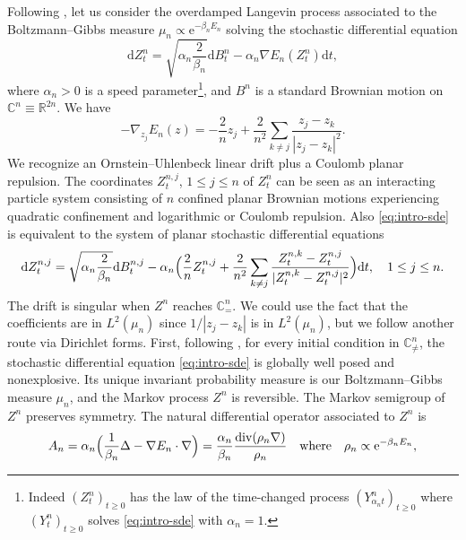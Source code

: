 \documentclass[11pt,reqno]{amsart}
\numberwithin{equation}{section}%
\numberwithin{figure}{section}%
\numberwithin{table}{section}
\theoremstyle{plain}
\theoremstyle{definition}
\begin{document}
Following \cite{BolleyChafaiFontbona}, let us consider the overdamped Langevin
process associated to the Boltzmann--Gibbs measure
$\mu_n\propto\mathrm{e}^{-\beta_n E_n}$ solving the stochastic differential
equation
\begin{equation}\label{eq:intro-sde}
  \mathrm{d}Z_t^n=\sqrt{\alpha_n\frac{2}{\beta_n}}\mathrm{d}B^n_t
  -\alpha_n\nabla E_n(Z_t^n)\mathrm{d}t,
\end{equation}
where $\alpha_n>0$ is a speed parameter\footnote{Indeed ${(Z^n_t)}_{t\geq0}$
  has the law of the time-changed process ${(Y^n_{\alpha_n t})}_{t\geq0}$
  where ${(Y^n_t)}_{t\geq0}$ solves \eqref{eq:intro-sde} with $\alpha_n=1$.},
and $B^n$ is a standard Brownian motion on
$\mathbb{C}^n\equiv\mathbb{R}^{2n}$. We have
\begin{equation}
  -\nabla_{z_j}E_n(z)
  =-\frac{2}{n}z_j+\frac{2}{n^2}\sum_{k\neq j}\frac{z_j-z_k}{|z_j-z_k|^2}.
\end{equation}
We recognize an Ornstein--Uhlenbeck linear drift plus a Coulomb planar
repulsion. The coordinates $Z^{n,j}_t$, $1\leq j\leq n$ of $Z^n_t$ can be seen
as an interacting particle system consisting of $n$ confined planar Brownian
motions experiencing quadratic confinement and logarithmic or Coulomb
repulsion. Also \eqref{eq:intro-sde} is equivalent to the system of planar
stochastic differential equations
\begin{equation}
  \mathrm{d}Z^{n,j}_t
  =\sqrt{\alpha_n\frac{2}{\beta_n}}\mathrm{d}B^{n,j}_t
  -\alpha_n\Bigl(\frac{2}{n}Z^{n,j}_t+\frac{2}{n^2}\sum_{k\neq j}\frac{Z^{n,k}_t-Z^{n,j}_t}{|Z^{n,k}_t-Z^{n,j}_t|^2}\Bigr)\mathrm{d}t,
  \quad 1\leq j\leq n.
\end{equation}
The drift is singular when $Z^n$ reaches $\mathbb{C}^n_{=}$. We could use the
fact that the coefficients are in $L^2(\mu_n)$ since $1/|z_j-z_k|$ is in
$L^2(\mu_n)$, but we follow another route via Dirichlet forms. First,
following \cite{BolleyChafaiFontbona}, for every initial condition in
$\mathbb{C}^n_{\neq}$, the stochastic differential equation
\eqref{eq:intro-sde} is globally well posed and nonexplosive. Its unique
invariant probability measure is our Boltzmann--Gibbs measure $\mu_n$, and the
Markov process $Z^n$ is reversible. The Markov semigroup of $Z^n$ preserves
symmetry. The natural differential operator associated to $Z^n$ is
\begin{equation}
  A_n=\alpha_n\Bigl(\frac{1}{\beta_n}\Delta-\nabla E_n\cdot\nabla\Bigr)
  =\frac{\alpha_n}{\beta_n}\frac{\mathrm{div}(\rho_n\nabla)}{\rho_n}
  \quad\text{where}\quad
  \rho_n\propto\mathrm{e}^{-\beta_nE_n},
\end{equation}
\end{document}
